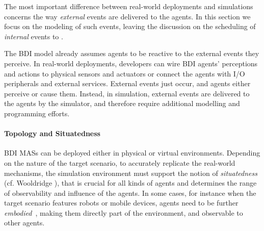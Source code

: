 The most important difference between real-world deployments and simulations
concerns the way \emph{external} events are delivered to the agents.
%
In this section we focus on the modeling of such events,
leaving the discussion on
the scheduling of \emph{internal} events to .

The \ac{BDI} model already assumes agents to be reactive to the external events they perceive.
%
In real-world deployments,
developers can wire \ac{BDI} agents' perceptions and actions to physical sensors and actuators
or connect the agents with I/O peripherals and external services.
%
External events just occur, and agents either perceive or cause them.
%
Instead,
in simulation,
external events are delivered to the agents by the simulator,
and therefore require additional modelling and programming efforts.



\paragraph{Topology and Situatedness}

\ac{BDI} \acp{MAS} can be deployed either in physical or virtual environments.
Depending on the nature of the target scenario,
to accurately replicate the real-world mechanisms,
the simulation environment must support the notion of \emph{situatedness} (cf. Wooldridge \cite{Wooldridge00}),
that is crucial for all kinds of agents
and determines the range of observability and influence of the agents.
%
In some cases,
for instance when the target scenario features robots or mobile devices,
agents need to be further \emph{embodied}~\cite{brooks1991ijcai},
making them directly part of the environment,
and observable to other agents.

